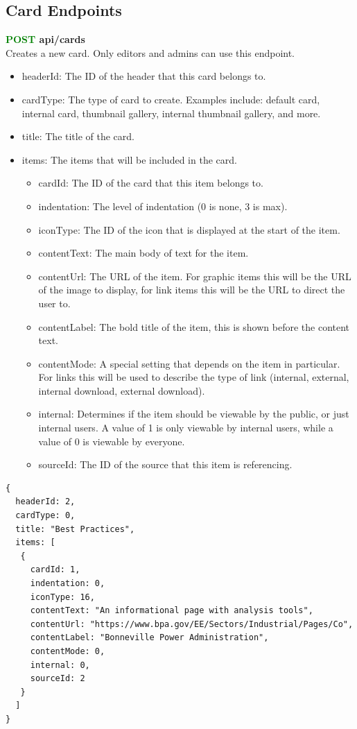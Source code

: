 \documentclass[onecolumn, draftclsnofoot,10pt, compsoc, usenames, dvipsnames]{IEEEtran}
\begin{document}
\subsection{Card Endpoints}

\noindent
\textbf{\textcolor{Green}{POST} api/cards} \\
Creates a new card. Only editors and admins can use this endpoint.
\begin{itemize}
    \item headerId: The ID of the header that this card belongs to.
    \item cardType: The type of card to create. Examples include: default card, internal card, thumbnail gallery, internal thumbnail gallery, and more.
    \item title: The title of the card.
    \item items: The items that will be included in the card.
    \begin{itemize}
        \item cardId: The ID of the card that this item belongs to.
        \item indentation: The level of indentation (0 is none, 3 is max).
        \item iconType: The ID of the icon that is displayed at the start of the item.
        \item contentText: The main body of text for the item.
        \item contentUrl: The URL of the item. For graphic items this will be the URL of the image to display, for link items this will be the URL to direct the user to.
        \item contentLabel: The bold title of the item, this is shown before the content text.
        \item contentMode: A special setting that depends on the item in particular. For links this will be used to describe the type of link (internal, external, internal download, external download).
        \item internal: Determines if the item should be viewable by the public, or just internal users. A value of 1 is only viewable by internal users, while a value of 0 is viewable by everyone.
        \item sourceId: The ID of the source that this item is referencing.
    \end{itemize}
\end{itemize}
\begin{lstlisting}[caption=Example Request Body]
{ 
  headerId: 2,
  cardType: 0,
  title: "Best Practices",
  items: [
   {
     cardId: 1,
     indentation: 0,
     iconType: 16,
     contentText: "An informational page with analysis tools",
     contentUrl: "https://www.bpa.gov/EE/Sectors/Industrial/Pages/Co",
     contentLabel: "Bonneville Power Administration",
     contentMode: 0,
     internal: 0,
     sourceId: 2
   }
  ]
}
\end{lstlisting}
\end{document}
